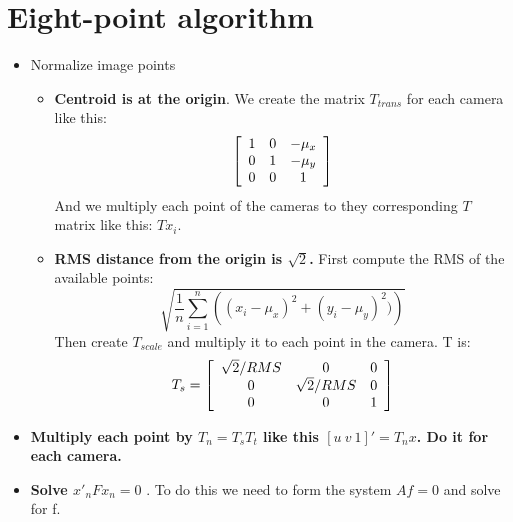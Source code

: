 \documentclass[a4paper,12pt]{article}
\begin{document}
\section{Eight-point algorithm}
\begin{itemize}
    \item Normalize image points
        \begin{itemize}
            \item \textbf{Centroid is at the origin}. We create the matrix $T_{trans}$ for each
                camera like this:
                \begin{equation}
                    \left [
                    \begin{array}[ ]{c c c}
                        1 & 0 & -\mu_x\\
                        0 & 1 & -\mu_y\\
                        0 & 0 & 1\\
                    \end{array}
                \right ]
                \end{equation}
                And we multiply each point of the cameras to they corresponding $T$ matrix like this:
                $Tx_i$.
            \item \textbf{RMS distance from the origin is $\sqrt{2}$.} First compute the RMS of the
                available points:
                \begin{equation}
                    \sqrt{ \frac{1}{n} \sum_{i=1}^n \left(  (x_i - \mu_x)^2 + (y_i- \mu_y)^2) \right) }
                \end{equation}
                Then create $T_{scale}$ and multiply it to each point in the camera. T is:
                \begin{equation}
                    T_s = \left[ 
                    \begin{array}[]{ccc}
                        \sqrt{2}/RMS & 0 & 0 \\
                        0 & \sqrt{2}/RMS  & 0 \\
                        0 & 0 & 1 
                    \end{array}
                     \right]
                \end{equation}
        \end{itemize}
    \item \textbf{Multiply each point by $T_n = T_sT_t$ like this $[u~ v~ 1]' = T_nx$. Do it for each camera.}
    \item \textbf{Solve $x'_nFx_n = 0$ }. To do this we need to form the system $Af = 0$ and solve for f.

\end{itemize}
\end{document}
